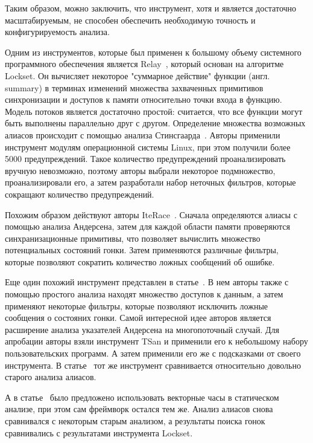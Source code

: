 Таким образом, можно заключить, что инструмент, хотя и является достаточно масштабируемым, не способен обеспечить необходимую точность и конфигурируемость анализа.

Одним из инструментов, которые был применен к большому объему системного программного обеспечения является Relay~\cite{Relay}, который основан на алгоритме Lockset.
Он вычисляет некоторое "суммарное действие" функции (англ. summary) в терминах изменений множества захваченных примитивов синхронизации и доступов к памяти относительно точки входа в функцию.
Модель потоков является достаточно простой: считается, что все функции могут быть выполнены параллельно друг с другом.
Определение множества возможных алиасов происходит с помощью анализа Стинсгаарда~\cite{Steensgaard:1996}.
Авторы применили инструмент модулям операционной системы Linux, при этом получили более 5000 предупреждений.
Такое количество предупреждений проанализировать вручную невозможно, поэтому авторы выбрали некоторое подмножество, проанализировали его, а затем разработали набор неточных фильтров, которые сокращают количество предупреждений.

Похожим образом действуют авторы IteRace~\cite{Radoi:2015:ETS}.
Сначала определяются алиасы с помощью анализа Андерсена, затем для каждой области памяти проверяются синхранизационные примитивы, что позволяет вычислить множество потенциальных состояний гонки.
Затем применяются различные фильтры, которые позволяют сократить количество ложных сообщений об ошибке.

Еще один похожий инструмент представлен в статье~\cite{Di:2016:ADD}.
В нем авторы также с помощью простого анализа находят множество доступов к данным, а затем применяют некоторые фильтры, которые позволяют исключить ложные сообщения о состояних гонки.
Самой интересной идее авторов является расширение анализа указателей Андерсена на многопоточный случай.
Для апробации авторы взяли инструмент TSan и применили его к небольшому набору пользовательских программ. 
А затем применили его же с подсказками от своего инструмента. 
В статье~\cite{Sui:2016} тот же инструмент сравнивается относительно довольно старого анализа алиасов.

А в статье~\cite{Zhou:2018} было предложено использовать векторные часы в статическом анализе, при этом сам фреймворк остался тем же.
Анализ алиасов снова сравнивался с некоторым старым анализом, а результаты поиска гонок сравнивались с результатами инструмента Lockset.


